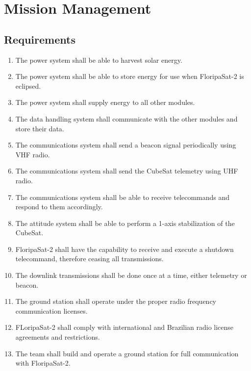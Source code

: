 %
%
%
%
%

%
%
%
%
%

\chapter{Mission Management} \label{ch:management}

\section{Requirements}

\begin{enumerate}
    \item The power system shall be able to harvest solar energy.
    \item The power system shall be able to store energy for use when FloripaSat-2 is eclipsed.
    \item The power system shall supply energy to all other modules.
    \item The data handling system shall communicate with the other modules and store their data.
    \item The communications system shall send a beacon signal periodically using VHF radio.
    \item The communications system shall send the CubeSat telemetry using UHF radio.
    \item The communications system shall be able to receive telecommands and respond to them accordingly.
    \item The attitude system shall be able to perform a 1-axis stabilization of the CubeSat.
    \item FloripaSat-2 shall have the capability to receive and execute a shutdown telecommand, therefore ceasing all transmissions.
    \item The downlink transmissions shall be done once at a time, either telemetry or beacon.
    \item The ground station shall operate under the proper radio frequency communication licenses.
    \item FLoripaSat-2 shall comply with international and Brazilian radio license agreements and restrictions.
    \item The team shall build and operate a ground station for full communication with FloripaSat-2.
\end{enumerate}

